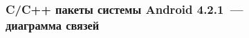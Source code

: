 \documentclass[hyperref={pdfpagelabels=false},10pt,gray]{beamer}
\begin{document}
\begin{frame}
\frametitle{C/C++ пакеты системы Android 4.2.1~---\\диаграмма связей}
\begin{figure}[h]
\end{figure}
\end{frame}

\end{document}
